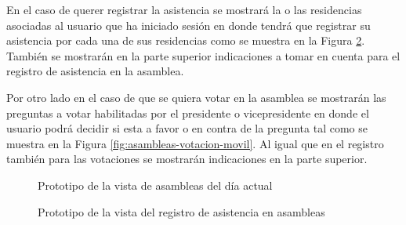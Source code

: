 En el caso de querer registrar la asistencia se mostrará la o las residencias asociadas al usuario que ha iniciado sesión en donde tendrá que registrar su asistencia por cada una de sus residencias como se muestra en la Figura \ref{fig:asambleas-asistencia-movil}.
También se mostrarán en la parte superior indicaciones a tomar en cuenta para el registro de asistencia en la asamblea.


Por otro lado en el caso de que se quiera votar en la asamblea se mostrarán las preguntas a votar habilitadas por el presidente o vicepresidente en donde el usuario podrá decidir si esta a favor o en contra de la pregunta tal como se muestra en la Figura \ref{fig:asambleas-votacion-movil}.
Al igual que en el registro también para las votaciones se mostrarán indicaciones en la parte superior.

\begin{figure}[H]
    \centering
    \caption{Prototipo de la vista de asambleas del día actual}
    \label{fig:asambleas-movil}
\end{figure}

\begin{figure}[H]
    \centering
    \caption{Prototipo de la vista del registro de asistencia en asambleas}
    \label{fig:asambleas-asistencia-movil}
\end{figure}

